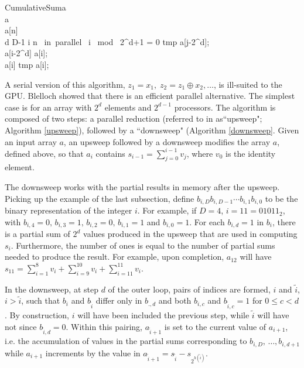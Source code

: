 \begin{pseudocode}[ruled]{CumulativeSum}{a}
\label{downsweep}
\\
a \GETS {}\\
a[n] \\
\FOR d \GETS D-1  \DO \BEGIN
  \FOR i  \TO n \mbox{ in parallel }\DO \BEGIN
    \IF i \mbox{ mod } 2^{d+1} = 0 \DO \BEGIN
    tmp \GETS a[j-2^{d}];\\
    a[i-2^{d}] \GETS a[i];\\
    a[i] \GETS tmp \oplus a[i];
    \END \END \END
{}
\end{pseudocode}

A serial version of this algorithm, $z_1 = x_1,\;z_2 = z_1 \oplus x_2,\dots$, is ill-suited to the GPU. Blelloch showed that there is an efficient parallel alternative. The simplest case is for an array with $2^d$ elements and $2^{d-1}$ processors. The algorithm is composed of two steps: a parallel reduction (referred to in \cite{blelloch1990} as``upsweep"; Algorithm \ref{upsweep}), followed by a ``downsweep" (Algorithm \ref{downsweep}. Given an input array $a$, an upsweep followed by a downsweep modifies the array $a$, defined above, so that $a_i$ contains $s_{i-1}=\sum_{j=0}^{i-1}v_j$, where $v_0$ is the identity element.

The downsweep works with the partial results in memory after the upsweep. Picking up the example of the last subsection, define $b_{i,D}b_{i,D-1}\cdots b_{i,1}b_{i,0}$ to be the binary representation of the integer $i$. For example, if $D=4$, $i=11=01011_{2}$, with $b_{i,4}=0,\, b_{i,3}=1,\,b_{i,2}=0,\,b_{i,1}=1$ and $b_{i,0}=1$. For each $b_{i,d}=1$ in $b_i$, there is a partial sum of $2^d$ values produced in the upsweep that are used in computing $s_i$. Furthermore, the number of ones is equal to the number of partial sums needed to produce the result. For example, upon completion, $a_{12}$ will have $s_{11}=\sum_{i=1}^8 v_i + \sum_{i=9}^{10}v_i+\sum_{i=11}^{11}v_i$. 

In the downsweep, at step $d$ of the outer loop, pairs of indices are formed, $i$ and $\tilde{i}$, $i>\tilde{i}$, such that $b_i$ and $b_{\tilde{i}}$ differ only in $b_{.,d}$ and both $b_{i,c}$ and $b_{\tilde{i},c}=1$ for $0\le c<d$. By construction, $i$ will have been included the previous step, while $\tilde{i}$ will have not since $b_{\tilde{i},d}=0$. Within this pairing, $a_{\tilde{i}+1}$ is set to the current value of $a_{i+1}$, i.e. the accumulation of values in the partial sums corresponding to $b_{i,D},\, \ldots, b_{i,d+1}$ while $a_{i+1}$ increments by the value in $a_{\tilde{i}+1}=s_{\tilde{i}}-s_{2^{h(\tilde{i})}}$.


